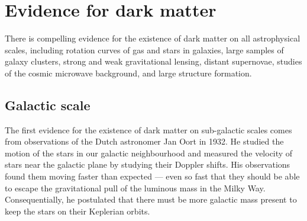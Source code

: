 \section{Evidence for dark matter}
\label{sec:dm:evidence}
There is compelling evidence for the existence of dark matter on all astrophysical scales, including rotation curves of gas and stars in galaxies, large samples of galaxy clusters, strong and weak gravitational lensing, distant supernovae, studies of the cosmic microwave background, and large structure formation.

\subsection{Galactic scale}
\label{sec:dm:evidence:galaxy}
The first evidence for the existence of dark matter on sub-galactic scales comes from observations of the Dutch astronomer Jan Oort in 1932. He studied the motion of the stars in our galactic neighbourhood and measured the velocity of stars near the galactic plane by studying their Doppler shifts. His observations found them moving faster than expected --- even so fast that they should be able to escape the gravitational pull of the luminous mass in the Milky Way. Consequentially, he postulated that there must be more galactic mass present to keep the stars on their Keplerian orbits.

